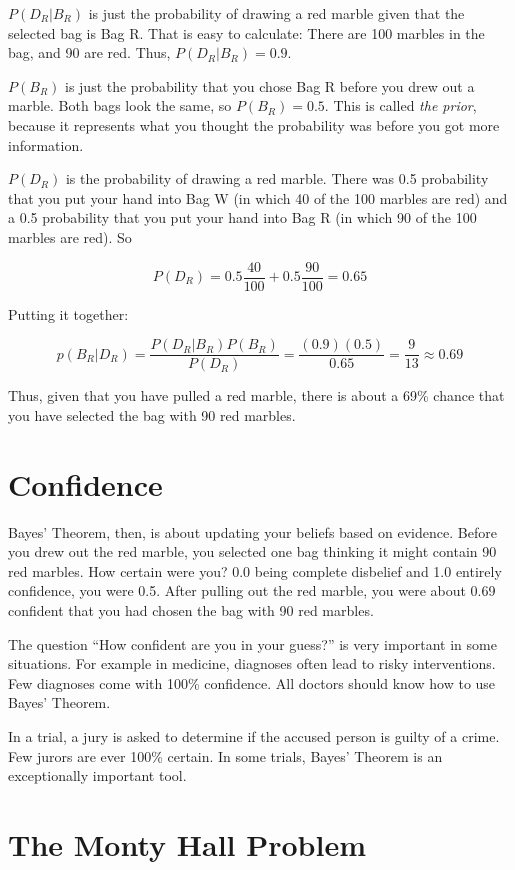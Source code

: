 $P(D_R | B_R)$ is just the probability of drawing a red marble given that the
selected bag is Bag R. That is easy to calculate: There are 100
marbles in the bag, and 90 are red. Thus, $P(D_R | B_R) = 0.9$.

$P(B_R)$ is just the probability that you chose Bag R before you drew
out a marble. Both bags look the same, so $P(B_R)= 0.5$. This is
called \textit{the prior}, because it represents what you thought the
probability was before you got more information.

$P(D_R)$ is the probability of drawing a red marble. There was 0.5
probability that you put your hand into Bag W (in which 40 of the 100
marbles are red) and a 0.5 probability that you put your hand into Bag
R (in which 90 of the 100 marbles are red).  So

$$P(D_R) = 0.5 \frac{40}{100} + 0.5 \frac{90}{100} = 0.65$$

Putting it together:

$$p(B_R | D_R) = \frac{ P(D_R | B_R) P(B_R) } {P(D_R)} = \frac{(0.9)(0.5)}{0.65} = \frac{9}{13} \approx 0.69$$

Thus, given that you have pulled a red marble, there is about a 69\% chance
that you have selected the bag with 90 red marbles.

\section{Confidence}

Bayes' Theorem, then, is about updating your beliefs based on
evidence.  Before you drew out the red marble, you selected one bag
thinking it might contain 90 red marbles. How certain were you? 0.0 being complete disbelief and 1.0 entirely
confidence, you were 0.5. After pulling out the red marble, you were about 0.69
confident that you had chosen the bag with 90 red marbles.

The question ``How confident are you in your guess?'' is very
important in some situations. For example in medicine, diagnoses often
lead to risky interventions. Few diagnoses come with 100\% confidence.
All doctors should know how to use Bayes' Theorem. 

In a trial, a jury is asked to determine if the accused person is
guilty of a crime. Few jurors are ever 100\% certain. In some trials, Bayes'
Theorem is an exceptionally important tool.

\section{The Monty Hall Problem}


